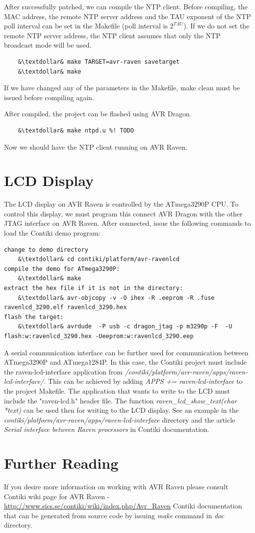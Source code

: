 \documentclass{article}
\begin{document}
After successfully patched, we can compile the NTP client.
Before compiling, the MAC address, the remote NTP server address and the TAU exponent of the NTP poll
interval can be set in the Makefile (poll interval is $2^{TAU}$).
If we do not set the remote NTP server address, the NTP client assumes that only the NTP broadcast mode
will be used.
\begin{lstlisting}
	&\textdollar& make TARGET=avr-raven savetarget
	&\textdollar& make
\end{lstlisting}
If we have changed any of the parameters in the Makefile, make clean must be issued before compiling again.

After compiled, the project can be flashed using AVR Dragon.
\begin{lstlisting}
	&\textdollar& make ntpd.u %! TODO
\end{lstlisting}
Now we should have the NTP client running on AVR Raven.

\section{LCD Display}
The LCD display on AVR Raven is controlled by the ATmega3290P CPU.
To control this display, we must program this connect AVR Dragon with the other JTAG interface
on AVR Raven.
After connected, issue the following commands to load the Contiki demo program:
\begin{lstlisting}
change to demo directory
	&\textdollar& cd contiki/platform/avr-ravenlcd
compile the demo for ATmega3290P:
	&\textdollar& make
extract the hex file if it is not in the directory:
	&\textdollar& avr-objcopy -v -O ihex -R .eeprom -R .fuse ravenlcd_3290.elf ravenlcd_3290.hex
flash the target:
	&\textdollar& avrdude  -P usb -c dragon_jtag -p m3290p -F  -U flash:w:ravenlcd_3290.hex -Ueeprom:w:ravenlcd_3290.eep
\end{lstlisting}
A serial communication interface can be further used for communication
between ATmega3290P and ATmega1284P.
In this case, the Contiki project must include the raven-lcd-interface application from
{\it{/contiki/platform/avr-raven/apps/raven-lcd-interface/}}.
This can be achieved by adding {\it{APPS += raven-lcd-interface}} to the project Makefile.
The application that wants to write to the LCD must include the "raven-lcd.h" header file.
The function {\it{raven\_lcd\_show\_text(char *text)}} can be used then for writing to the LCD display.
See an example in the {\it{contiki/platform/avr-raven/apps/raven-lcd-interface}} directory
and the article {\it{Serial interface between Raven processors}} in Contiki documentation.


\section{Further Reading}
If you desire more information on working with AVR Raven please consult
Contiki wiki page for AVR Raven - \url{http://www.sics.se/contiki/wiki/index.php/Avr_Raven}
Contiki documentation that can be generated from source code
by issuing {\it{make}} command in {\it{doc}} directory.
\end{document}
